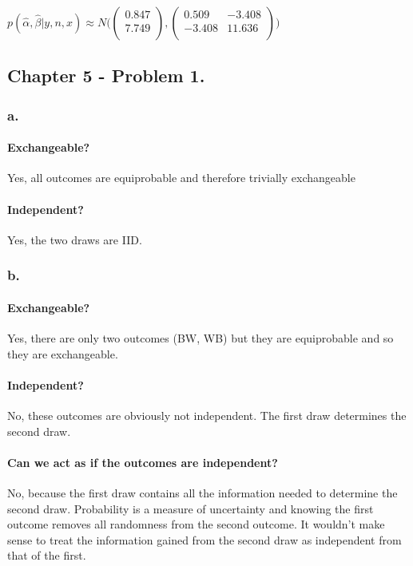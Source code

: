 \documentclass{article}
\begin{document}
\( p(\hat{\alpha}, \hat{\beta} \vert y, n, x) \approx
N \big( 
 \begin{pmatrix*}
0.847 \\
7.749 \\
 \end{pmatrix*}, 
\begin{pmatrix*}
  0.509 & -3.408 \\
 -3.408 & 11.636 \\
 \end{pmatrix*}
 \big)
\)



\subsection{Chapter 5 - Problem 1.}

\subsubsection{a.} 
\paragraph{Exchangeable?} Yes, all outcomes are equiprobable and therefore trivially exchangeable
\paragraph{Independent?} Yes, the two draws are IID.

\subsubsection{b.} 
\paragraph{Exchangeable?} Yes, there are only two outcomes (BW, WB) but they are equiprobable and
so they are exchangeable. 
\paragraph{Independent?} No, these outcomes are obviously not independent. The first draw determines the second draw.
\paragraph{Can we act as if the outcomes are independent?} No, because the first draw contains all the information
needed to determine the second draw. Probability is a measure of uncertainty and knowing the first outcome
removes all randomness from the second outcome. It wouldn't make sense to treat the information gained
from the second draw as independent from that of the first.
\end{document}
